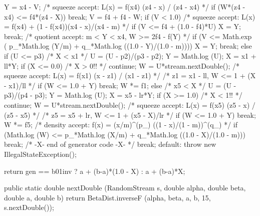 \begin{code}
\begin{hide}
{{{{               Y = x4 - V;
               /* squeeze accept:    L(x) = f(x4) (z4 - x) / (z4 - x4)  */
               if (W*(z4 - x4) <= f4*(z4 - X))
                  break;
               V = f4 + f4 - W;
               if (V < 1.0) {
              /* squeeze accept: L(x) = f(x4) + (1 - f(x4))(x4 - x)/(x4 - m) */
                  if (V <= f4 + (1.0 - f4)*U) {
                     X = Y;
                     break;
                  }
                  /* quotient accept:   m < Y < x4,   W >= 2f4 - f(Y)    */
                  if (V <= Math.exp ( p_*Math.log (Y/m) 
                                    + q_*Math.log ((1.0 - Y)/(1.0 - m)))) {
                     X = Y;
                     break;
                  }
               }
            }
            else if (U <= p3) {              /*      X < x1     */
               U = (U - p2)/(p3 - p2);
               Y = Math.log (U);
               X = x1 + ll*Y;
               if (X <= 0.0)                   /*      X > 0!!    */
                  continue; 
               W = U*stream.nextDouble();
               /* squeeze accept:  L(x) = f(x1) (x - z1) / (x1 - z1)   */
               /*      z1 = x1 - ll,   W <= 1 + (X - x1)/ll         */
               if (W <= 1.0 + Y)
                  break;
               W *= f1;
            }
            else {                      /*    x5 < X       */
               U = (U - p3)/(p4 - p3);
               Y = Math.log (U);
               X = x5 - lr*Y;
               if (X >= 1.0)                /*      X < 1!!    */
                  continue;
               W = U*stream.nextDouble();
               /* squeeze accept: L(x) = f(x5) (z5 - x) / (z5 - x5)    */
               /*                z5 = x5 + lr,   W <= 1 + (x5 - X)/lr  */
               if (W <= 1.0 + Y)
                  break;
               W *= f5;
            }
            /* density accept:  f(x) = (x/m)^(p_) ((1 - x)/(1 - m))^(q_) */
            if (Math.log (W) <= p_*Math.log (X/m) 
                                + q_*Math.log ((1.0 - X)/(1.0 - m)))
               break;
         }
         /* -X- end of generator code -X- */
         break;
      default:  throw new IllegalStateException();
      }

      return gen == b01inv ? a + (b-a)*(1.0 - X) : a + (b-a)*X;
   }

   public static double nextDouble (RandomStream s, 
                                    double alpha, double beta, 
                                    double a, double b) {
      return BetaDist.inverseF (alpha, beta, a, b, 15, s.nextDouble());
   }



\end{hide}
\end{code}

